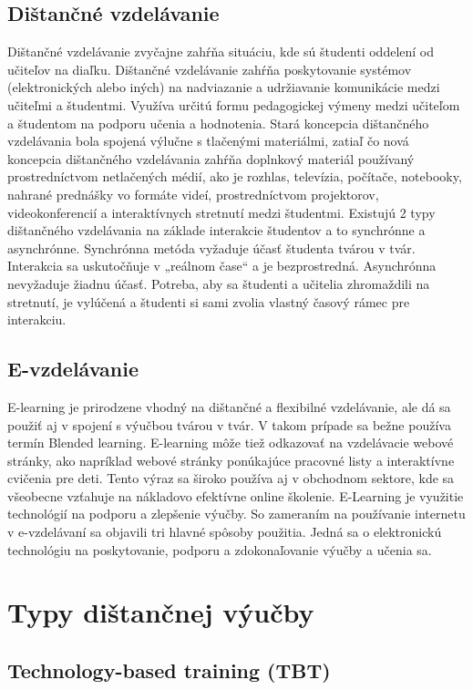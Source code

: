 \documentclass[10pt,oneside,slovak,a4paper]{article}
\begin{document}
\subsection{Dištančné vzdelávanie}
Dištančné vzdelávanie zvyčajne zahŕňa situáciu, kde sú študenti oddelení od učiteľov na diaľku. Dištančné vzdelávanie zahŕňa poskytovanie systémov (elektronických alebo iných) na nadviazanie a udržiavanie komunikácie medzi učiteľmi a študentmi. Využíva určitú formu pedagogickej výmeny  medzi učiteľom a študentom na podporu učenia a hodnotenia.
Stará koncepcia dištančného vzdelávania bola spojená výlučne s tlačenými materiálmi, zatiaľ čo nová koncepcia dištančného vzdelávania zahŕňa doplnkový materiál používaný prostredníctvom netlačených médií, ako je rozhlas, televízia, počítače, notebooky, nahrané prednášky vo formáte videí, prostredníctvom projektorov, videokonferencií a interaktívnych stretnutí medzi študentmi.
Existujú 2 typy dištančného vzdelávania na základe interakcie študentov a to synchrónne a asynchrónne. Synchrónna metóda vyžaduje účasť študenta tvárou v tvár. Interakcia sa uskutočňuje v „reálnom čase“ a je bezprostredná. Asynchrónna nevyžaduje žiadnu účasť. Potreba, aby sa študenti a učitelia zhromaždili na stretnutí, je vylúčená a študenti si sami zvolia vlastný časový rámec pre interakciu. \cite{India}
\subsection{E-vzdelávanie}
E-learning je prirodzene vhodný na dištančné a flexibilné vzdelávanie, ale dá sa použiť aj v spojení s výučbou tvárou v tvár. V takom prípade sa bežne používa termín Blended learning. E-learning môže tiež odkazovať na vzdelávacie webové stránky, ako napríklad webové stránky ponúkajúce pracovné listy a interaktívne cvičenia pre deti. Tento výraz sa široko používa aj v obchodnom sektore, kde sa všeobecne vzťahuje na nákladovo efektívne online školenie. E-Learning je využitie technológií na podporu a zlepšenie výučby. So zameraním na používanie internetu v e-vzdelávaní sa objavili tri hlavné spôsoby použitia. Jedná sa o elektronickú technológiu na poskytovanie, podporu a zdokonaľovanie výučby a učenia sa.\cite{elearningDef}

\section{Typy dištančnej výučby}

\subsection{Technology-based training (TBT)}
\end{document}
